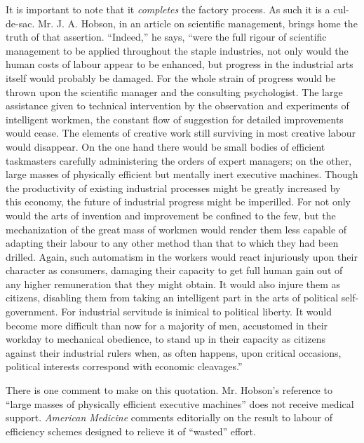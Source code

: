 \documentclass{book}
\begin{document}
It is important to note that it \emph{completes} the factory process. As such it is a cul-de-sac. Mr. J. A. Hobson, in an article on scientific management, brings home the truth of that assertion. “Indeed,” he says, “were the full rigour of scientific management to be applied throughout the staple industries, not only would the human costs of labour appear to be enhanced, but progress in the industrial arts itself would probably be damaged. For the whole strain of progress would be thrown upon the scientific manager and the consulting psychologist. The large assistance given to technical intervention by the observation and experiments of intelligent workmen, the constant flow of suggestion for detailed improvements would cease. The elements of creative work still surviving in most creative labour would disappear. On the one hand there would be small bodies of efficient taskmasters carefully administering the orders of expert managers; on the other, large masses of physically efficient but mentally inert executive machines. Though the productivity of existing industrial processes might be greatly increased by this economy, the future of industrial progress might be imperilled. For not only would the arts of invention and improvement be confined to the few, but the mechanization of the great mass of workmen would render them less capable of adapting their labour to any other method than that to which they had been drilled. Again, such automatism in the workers would react injuriously upon their character as consumers, damaging their capacity to get full human gain out of any higher remuneration that they might obtain. It would also injure them as citizens, disabling them from taking an intelligent part in the arts of political self-government. For industrial servitude is inimical to political liberty. It would become more difficult than now for a majority of men, accustomed in their workday to mechanical obedience, to stand up in their capacity as citizens against their industrial rulers when, as often happens, upon critical occasions, political interests correspond with economic cleavages.”\footnotemark[3]

There is one comment to make on this quotation. Mr. Hobson’s reference to “large masses of physically efficient executive machines” does not receive medical support. \emph{American Medicine} comments editorially on the result to labour of efficiency schemes designed to relieve it of “wasted” effort.
\end{document}
